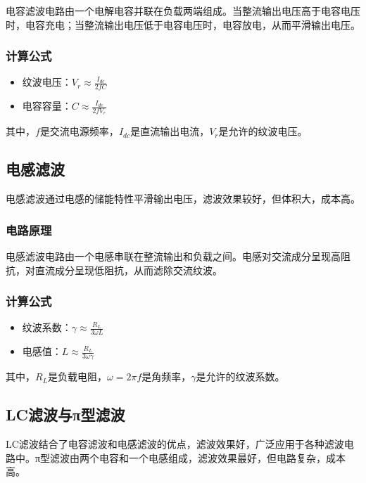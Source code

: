 \documentclass[12pt,UTF8]{ctexbook}
\begin{document}
电容滤波电路由一个电解电容并联在负载两端组成。当整流输出电压高于电容电压时，电容充电；当整流输出电压低于电容电压时，电容放电，从而平滑输出电压。

\subsubsection{计算公式}

\begin{itemize}
    \item 纹波电压：$V_{r} \approx \frac{I_{dc}}{2fC}$
    \item 电容容量：$C \approx \frac{I_{dc}}{2fV_{r}}$
\end{itemize}

其中，$f$是交流电源频率，$I_{dc}$是直流输出电流，$V_{r}$是允许的纹波电压。

\subsection{电感滤波}

电感滤波通过电感的储能特性平滑输出电压，滤波效果较好，但体积大，成本高。

\subsubsection{电路原理}

电感滤波电路由一个电感串联在整流输出和负载之间。电感对交流成分呈现高阻抗，对直流成分呈现低阻抗，从而滤除交流纹波。

\subsubsection{计算公式}

\begin{itemize}
    \item 纹波系数：$\gamma \approx \frac{R_{L}}{3\omega L}$
    \item 电感值：$L \approx \frac{R_{L}}{3\omega \gamma}$
\end{itemize}

其中，$R_{L}$是负载电阻，$\omega = 2\pi f$是角频率，$\gamma$是允许的纹波系数。

\subsection{LC滤波与π型滤波}

LC滤波结合了电容滤波和电感滤波的优点，滤波效果好，广泛应用于各种滤波电路中。π型滤波由两个电容和一个电感组成，滤波效果最好，但电路复杂，成本高。
\end{document}
